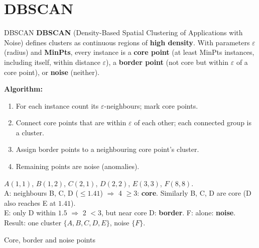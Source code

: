 \section{DBSCAN}
\begin{dfn}{DBSCAN}
\textbf{DBSCAN} (Density-Based Spatial Clustering of Applications with Noise) defines clusters as continuous regions of \textbf{high density}. With parameters $\varepsilon$ (radius) and \textbf{MinPts}, every instance is a \textbf{core point} (at least MinPts instances, including itself, within distance $\varepsilon$), a \textbf{border point} (not core but within $\varepsilon$ of a core point), or \textbf{noise} (neither).
\end{dfn}
\textbf{Algorithm:}
\begin{enumerate}
  \item For each instance count its $\varepsilon$-neighbours; mark core points.
  \item Connect core points that are within $\varepsilon$ of each other; each connected group is a cluster.
  \item Assign border points to a neighbouring core point's cluster.
  \item Remaining points are noise (anomalies).
\end{enumerate}
\begin{numer}[: DBSCAN, $\varepsilon=1.5$, MinPts $=3$]
$A(1,1)$, $B(1,2)$, $C(2,1)$, $D(2,2)$, $E(3,3)$, $F(8,8)$.\\
A: neighbours B, C, D ($\le1.41$) $\Rightarrow$ 4 $\ge3$: \textbf{core}. Similarly B, C, D are core (D also reaches E at $1.41$).\\
E: only D within $1.5$ $\Rightarrow$ 2 $<3$, but near core D: \textbf{border}. F: alone: \textbf{noise}.\\
Result: one cluster $\{A,B,C,D,E\}$, noise $\{F\}$.
\end{numer}
\begin{drawit}{Core, border and noise points}
\centering
{}
\end{drawit}


